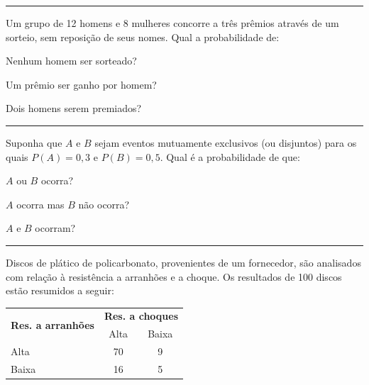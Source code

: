\documentclass[a4paper,11pt,fleqn]{article}\usepackage[]{graphicx}\usepackage[]{color}
\theoremstyle{definition}
\begin{document}
\begin{compactenum}
\vspace{0.3cm}
\hrule
\vspace{0.3cm}

\item Um grupo de 12 homens e 8 mulheres concorre a três prêmios através
  de um sorteio, sem reposição de seus nomes. Qual a probabilidade de:
  \begin{compactenum}
  \item Nenhum homem ser sorteado?
  \item Um prêmio ser ganho por homem?
  \item Dois homens serem premiados?
  \end{compactenum}

\vspace{0.3cm}
\hrule
\vspace{0.3cm}

\item Suponha que $A$ e $B$ sejam eventos mutuamente exclusivos (ou
  disjuntos) para os quais $P(A) = 0,3$ e $P(B) = 0,5$. Qual é a
  probabilidade de que:
  \begin{compactenum}
  \item $A$ ou $B$ ocorra?
  \item $A$ ocorra mas $B$ não ocorra?
  \item $A$ e $B$ ocorram?
  \end{compactenum}

\vspace{0.3cm}
\hrule
\vspace{0.3cm}

\item Discos de plático de policarbonato, provenientes de um fornecedor,
  são analisados com relação à resistência a arranhões e a choque. Os
  resultados de 100 discos estão resumidos a seguir:
  \begin{table}[!h]
    \centering
    \begin{tabular}{lcc}
      \hline
      \multirow{2}{*}{\textbf{Res. a arranhões}}
      & \multicolumn{2}{l}{\textbf{Res. a choques}} \\
      \cline{2-3}
                & Alta         & Baixa       \\
      \hline
      Alta      & 70           & 9           \\
      Baixa     & 16           & 5           \\
      \hline
    \end{tabular}
  \end{table}


\end{compactenum}
\end{document}
